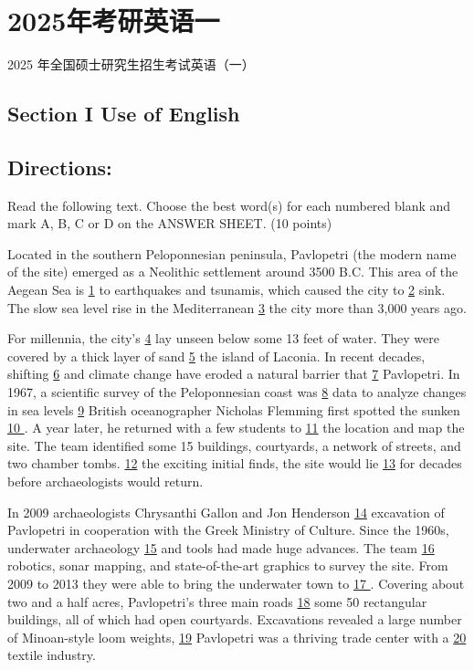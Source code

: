 \documentclass[UTF8,11pt]{ctexart}
\begin{document}
\section*{2025年考研英语一}
2025 年全国硕士研究生招生考试英语（一）


\subsection*{\textbf{Section I Use of English}}


\subsection*{\textbf{Directions:}}


Read the following text. Choose the best word(s) for each numbered blank and mark A, B, C or D on the ANSWER SHEET. (10 points)


Located in the southern Peloponnesian peninsula, Pavlopetri (the modern name of the site) emerged as a Neolithic settlement around 3500 B.C. This area of the Aegean Sea is \uline{1} to earthquakes and tsunamis, which caused the city to \uline{2} sink. The slow sea level rise in the Mediterranean \uline{3} the city more than 3,000 years ago.


For millennia, the city’s \uline{4} lay unseen below some 13 feet of water. They were covered by a thick layer of sand \uline{5} the island of Laconia. In recent decades, shifting \uline{6} and climate change have eroded a natural barrier that \uline{7} Pavlopetri. In 1967, a scientific survey of the Peloponnesian coast was \uline{8} data to analyze changes in sea levels \uline{9} British oceanographer Nicholas Flemming first spotted the sunken \uline{10 }. A year later, he returned with a few students to \uline{11} the location and map the site. The team identified some 15 buildings, courtyards, a network of streets, and two chamber tombs. \uline{12} the exciting initial finds, the site would lie \uline{13} for decades before archaeologists would return.


In 2009 archaeologists Chrysanthi Gallon and Jon Henderson \uline{14} excavation of Pavlopetri in cooperation with the Greek Ministry of Culture. Since the 1960s, underwater archaeology \uline{15} and tools had made huge advances. The team \uline{16} robotics, sonar mapping, and state-of-the-art graphics to survey the site. From 2009 to 2013 they were able to bring the underwater town to \uline{17 }. Covering about two and a half acres, Pavlopetri’s three main roads \uline{18} some 50 rectangular buildings, all of which had open courtyards. Excavations revealed a large number of Minoan-style loom weights, \uline{19} Pavlopetri was a thriving trade center with a \uline{20} textile industry.
\end{document}
